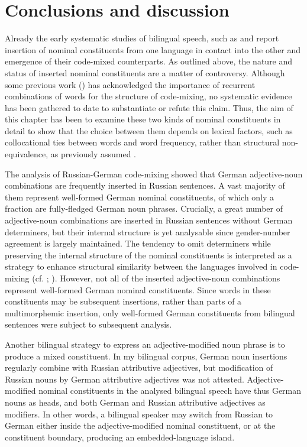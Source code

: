 \section{Conclusions and discussion}

Already the early systematic studies of bilingual speech, such as \citet{pfaff-constraints-1979} and \citet{poplack-sometimes-1980} report insertion of nominal constituents from one language in contact into the other and emergence of their code-mixed counterparts. As outlined above, the nature and status of inserted nominal constituents are a matter of controversy. Although some previous work (\citealt{backus-two-1996, boumans-syntax-1998}) has acknowledged the importance of recurrent combinations of words for the structure of code-mixing, no systematic evidence has been gathered to date to substantiate or refute this claim. Thus, the aim of this chapter has been to examine these two kinds of nominal constituents in detail to show that the choice between them depends on lexical factors, such as collocational ties between words and word frequency, rather than structural non-equivalence, as previously assumed \citep{myers-scotton-matching-1995,myers-scotton-contact-2002}.

The analysis of Russian-German code-mixing showed that German adjective-noun combinations are frequently inserted in Russian sentences. A vast majority of them represent well-formed German nominal constituents, of which only a fraction are fully-fledged German noun phrases. Crucially, a great number of adjective-noun combinations are inserted in Russian sentences without German determiners, but their internal structure is yet analysable since gender-number agreement is largely maintained. The tendency to omit determiners while preserving the internal structure of the nominal constituents is interpreted as a strategy to enhance structural similarity between the languages involved in code-mixing (cf. \citealt[][]{hakimov-backus-20-intro};  \citealt[][]{sebba-09}). However, not all of the inserted adjective-noun combinations represent well-formed German nominal constituents. Since words in these constituents may be subsequent insertions, rather than parts of a multimorphemic insertion, only well-formed German constituents from bilingual sentences were subject to subsequent analysis. 

Another bilingual strategy to express an adjective-modified noun phrase is to produce a mixed constituent. In my bilingual corpus, German noun insertions regularly combine with Russian attributive adjectives, but modification of Russian nouns by German attributive adjectives was not attested. Adjective-modified nominal constituents in the analysed bilingual speech have thus German nouns as heads, and both German and Russian attributive adjectives as modifiers. In other words, a bilingual speaker may switch from Russian to German either inside the adjective-modified nominal constituent, or at the constituent boundary,  producing an embedded-language island.

